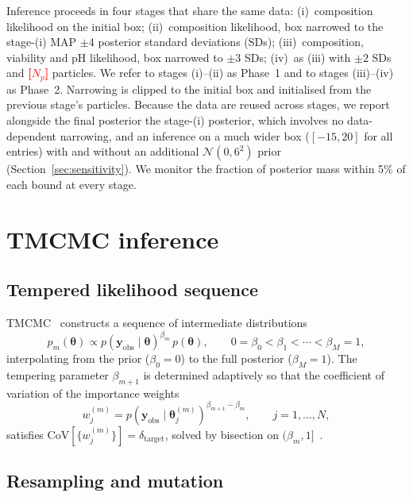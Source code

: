 \documentclass[pdflatex,sn-mathphys-num,lineno]{sn-jnl}
\newcommand{\btheta}{\boldsymbol{\theta}}
\newcommand{\yobs}{\mathbf{y}_{\mathrm{obs}}}
\newcommand{\TBD}[1]{\textcolor{red}{\textbf{[#1]}}}
\begin{document}
Inference proceeds in four stages that share the same data:
(i)~composition likelihood on the initial box;
(ii)~composition likelihood, box narrowed to the stage-(i) MAP $\pm4$ posterior standard deviations (SDs);
(iii)~composition, viability and pH likelihood, box narrowed to $\pm3$ SDs;
(iv)~as (iii) with $\pm2$ SDs and \TBD{$N_p$} particles.
We refer to stages (i)--(ii) as Phase~1 and to stages (iii)--(iv) as Phase~2.
Narrowing is clipped to the initial box and initialised from the previous stage's particles.
Because the data are reused across stages, we report alongside the final posterior the stage-(i) posterior, which involves no data-dependent narrowing, and an inference on a much wider box ($[-15,20]$ for all entries) with and without an additional $\mathcal{N}(0,6^2)$ prior (Section~\ref{sec:sensitivity}).
We monitor the fraction of posterior mass within 5\% of each bound at every stage.

\section{TMCMC inference}
\label{sec:tmcmc}

\subsection{Tempered likelihood sequence}

TMCMC~\cite{ChingChen2007TMCMC, DelMoral2006SMC, Chopin2002SMC} constructs a sequence of intermediate distributions
\begin{equation}
p_m(\btheta) \propto p(\yobs\mid\btheta)^{\beta_m}\,p(\btheta),
\qquad
0=\beta_0<\beta_1<\cdots<\beta_M=1,
\label{eq:tempered}
\end{equation}
interpolating from the prior ($\beta_0=0$) to the full posterior ($\beta_M=1$).
The tempering parameter $\beta_{m+1}$ is determined adaptively so that the coefficient of variation of the importance weights
\begin{equation}
w_j^{(m)} = p(\yobs\mid\btheta_j^{(m)})^{\beta_{m+1}-\beta_m},
\qquad j=1,\dots,N,
\label{eq:weights}
\end{equation}
satisfies $\mathrm{CoV}[\{w_j^{(m)}\}]=\delta_{\mathrm{target}}$, solved by bisection on $(\beta_m,1]$~\cite{Betz2016TMCMC}.

\subsection{Resampling and mutation}
\end{document}
